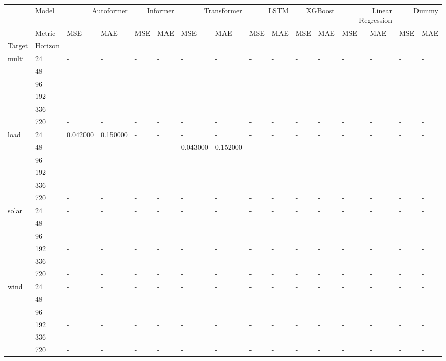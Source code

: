 \begin{tabular}{llllllllllllllll}
\toprule
 & Model & \multicolumn{2}{r}{Autoformer} & \multicolumn{2}{r}{Informer} & \multicolumn{2}{r}{Transformer} & \multicolumn{2}{r}{LSTM} & \multicolumn{2}{r}{XGBoost} & \multicolumn{2}{r}{Linear Regression} & \multicolumn{2}{r}{Dummy} \\
 & Metric & MSE & MAE & MSE & MAE & MSE & MAE & MSE & MAE & MSE & MAE & MSE & MAE & MSE & MAE \\
Target & Horizon &  &  &  &  &  &  &  &  &  &  &  &  &  &  \\
\midrule
\multirow[t]{6}{*}{multi} & 24 & - & - & - & - & - & - & - & - & - & - & - & - & - & - \\
 & 48 & - & - & - & - & - & - & - & - & - & - & - & - & - & - \\
 & 96 & - & - & - & - & - & - & - & - & - & - & - & - & - & - \\
 & 192 & - & - & - & - & - & - & - & - & - & - & - & - & - & - \\
 & 336 & - & - & - & - & - & - & - & - & - & - & - & - & - & - \\
 & 720 & - & - & - & - & - & - & - & - & - & - & - & - & - & - \\
\cline{1-16}
\multirow[t]{6}{*}{load} & 24 & 0.042000 & 0.150000 & - & - & - & - & - & - & - & - & - & - & - & - \\
 & 48 & - & - & - & - & 0.043000 & 0.152000 & - & - & - & - & - & - & - & - \\
 & 96 & - & - & - & - & - & - & - & - & - & - & - & - & - & - \\
 & 192 & - & - & - & - & - & - & - & - & - & - & - & - & - & - \\
 & 336 & - & - & - & - & - & - & - & - & - & - & - & - & - & - \\
 & 720 & - & - & - & - & - & - & - & - & - & - & - & - & - & - \\
\cline{1-16}
\multirow[t]{6}{*}{solar} & 24 & - & - & - & - & - & - & - & - & - & - & - & - & - & - \\
 & 48 & - & - & - & - & - & - & - & - & - & - & - & - & - & - \\
 & 96 & - & - & - & - & - & - & - & - & - & - & - & - & - & - \\
 & 192 & - & - & - & - & - & - & - & - & - & - & - & - & - & - \\
 & 336 & - & - & - & - & - & - & - & - & - & - & - & - & - & - \\
 & 720 & - & - & - & - & - & - & - & - & - & - & - & - & - & - \\
\cline{1-16}
\multirow[t]{6}{*}{wind} & 24 & - & - & - & - & - & - & - & - & - & - & - & - & - & - \\
 & 48 & - & - & - & - & - & - & - & - & - & - & - & - & - & - \\
 & 96 & - & - & - & - & - & - & - & - & - & - & - & - & - & - \\
 & 192 & - & - & - & - & - & - & - & - & - & - & - & - & - & - \\
 & 336 & - & - & - & - & - & - & - & - & - & - & - & - & - & - \\
 & 720 & - & - & - & - & - & - & - & - & - & - & - & - & - & - \\
\cline{1-16}
\bottomrule
\end{tabular}
